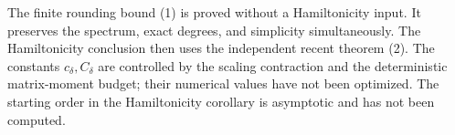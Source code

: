 \begin{remark}
The finite rounding bound (1) is proved without a Hamiltonicity
input. It preserves the spectrum, exact degrees, and simplicity
simultaneously. The Hamiltonicity conclusion then uses the
independent recent theorem (2).
The constants \(c_\delta,C_\delta\) are controlled by the
scaling contraction and the deterministic matrix-moment budget; their numerical
values have not been optimized.
The starting order in the Hamiltonicity corollary is
asymptotic and has not been computed.
\end{remark}
